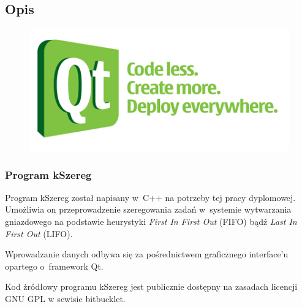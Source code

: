 \documentclass{prezentacja}
\begin{document}
\subsection{Opis}
\begin{frame}   
    \begin{figure}
        \vspace{-60pt}
        \includegraphics[width=\linewidth, keepaspectratio=true]{./obrazki/QtLogo}
    \end{figure}
    
    \frametitle{Program kSzereg}
    Program kSzereg został napisany w~C++ na potrzeby tej pracy dyplomowej. Umożliwia on przeprowadzenie szeregowania zadań w~systemie wytwarzania gniazdowego na podstawie heurystyki \emph{First In First Out} (FIFO) bądź \emph{Last In First Out} (LIFO). 
    
    Wprowadzanie danych odbywa się za pośrednictwem graficznego interface'u opartego o~framework Qt\cite{qt}.
    
    Kod żródłowy programu kSzereg jest publicznie dostępny na zasadach licencji GNU GPL\cite{gpl} w sewisie bitbucklet\cite{bit}. 
    
\end{frame}
\end{document}

